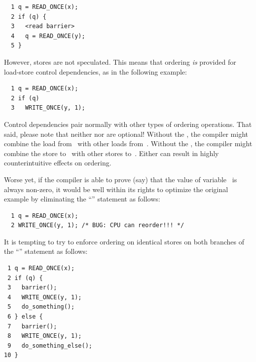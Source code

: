 \vspace{5pt}
\begin{minipage}[t]{\columnwidth}
\scriptsize
\begin{verbatim}
  1 q = READ_ONCE(x);
  2 if (q) {
  3   <read barrier>
  4   q = READ_ONCE(y);
  5 }
\end{verbatim}
\end{minipage}
\vspace{5pt}

However, stores are not speculated.
This means that ordering \emph{is} provided for load-store control
dependencies, as in the following example:

\vspace{5pt}
\begin{minipage}[t]{\columnwidth}
\scriptsize
\begin{verbatim}
  1 q = READ_ONCE(x);
  2 if (q)
  3   WRITE_ONCE(y, 1);
\end{verbatim}
\end{minipage}
\vspace{5pt}

Control dependencies pair normally with other types of ordering operations.
That said, please note that neither  nor 
are optional!
Without the , the compiler might combine the load
from~ with other loads from~.
Without the , the compiler might combine the store
to~ with other stores to~.
Either can result in highly counterintuitive effects on ordering.

Worse yet, if the compiler is able to prove (say) that the value of
variable~ is always non-zero, it would be well within its rights
to optimize the original example by eliminating the ``'' statement
as follows:

\vspace{5pt}
\begin{minipage}[t]{\columnwidth}
\scriptsize
\begin{verbatim}
  1 q = READ_ONCE(x);
  2 WRITE_ONCE(y, 1); /* BUG: CPU can reorder!!! */
\end{verbatim}
\end{minipage}
\vspace{5pt}

It is tempting to try to enforce ordering on identical stores on both
branches of the ``'' statement as follows:

\vspace{5pt}
\begin{minipage}[t]{\columnwidth}
\scriptsize
\begin{verbatim}
 1 q = READ_ONCE(x);
 2 if (q) {
 3   barrier();
 4   WRITE_ONCE(y, 1);
 5   do_something();
 6 } else {
 7   barrier();
 8   WRITE_ONCE(y, 1);
 9   do_something_else();
10 }
\end{verbatim}
\end{minipage}
\vspace{5pt}

